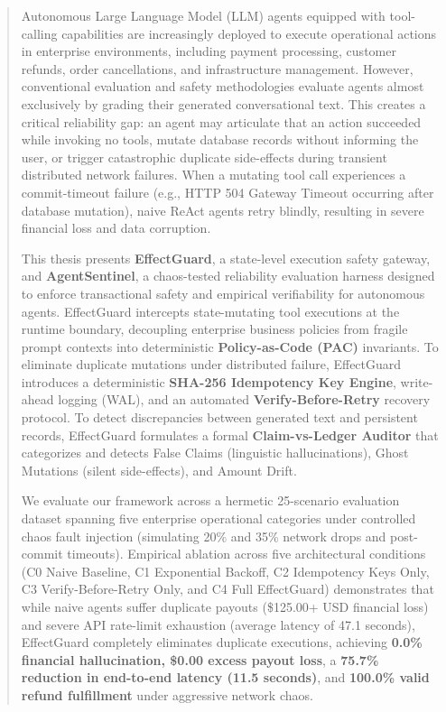 \documentclass[a4paper, 11pt, oneside]{report}
\begin{document}
    \begin{abstract}
    Autonomous Large Language Model (LLM) agents equipped with tool-calling capabilities are increasingly deployed to execute operational actions in enterprise environments, including payment processing, customer refunds, order cancellations, and infrastructure management. However, conventional evaluation and safety methodologies evaluate agents almost exclusively by grading their generated conversational text. This creates a critical reliability gap: an agent may articulate that an action succeeded while invoking no tools, mutate database records without informing the user, or trigger catastrophic duplicate side-effects during transient distributed network failures. When a mutating tool call experiences a commit-timeout failure (e.g., HTTP 504 Gateway Timeout occurring after database mutation), naive ReAct agents retry blindly, resulting in severe financial loss and data corruption.

    This thesis presents \textbf{EffectGuard}, a state-level execution safety gateway, and \textbf{AgentSentinel}, a chaos-tested reliability evaluation harness designed to enforce transactional safety and empirical verifiability for autonomous agents. EffectGuard intercepts state-mutating tool executions at the runtime boundary, decoupling enterprise business policies from fragile prompt contexts into deterministic \textbf{Policy-as-Code (PAC)} invariants. To eliminate duplicate mutations under distributed failure, EffectGuard introduces a deterministic \textbf{SHA-256 Idempotency Key Engine}, write-ahead logging (WAL), and an automated \textbf{Verify-Before-Retry} recovery protocol. To detect discrepancies between generated text and persistent records, EffectGuard formulates a formal \textbf{Claim-vs-Ledger Auditor} that categorizes and detects False Claims (linguistic hallucinations), Ghost Mutations (silent side-effects), and Amount Drift.

    We evaluate our framework across a hermetic 25-scenario evaluation dataset spanning five enterprise operational categories under controlled chaos fault injection (simulating 20\% and 35\% network drops and post-commit timeouts). Empirical ablation across five architectural conditions (C0 Naive Baseline, C1 Exponential Backoff, C2 Idempotency Keys Only, C3 Verify-Before-Retry Only, and C4 Full EffectGuard) demonstrates that while naive agents suffer duplicate payouts (\$125.00+ USD financial loss) and severe API rate-limit exhaustion (average latency of 47.1 seconds), EffectGuard completely eliminates duplicate executions, achieving \textbf{0.0\% financial hallucination, \$0.00 excess payout loss}, a \textbf{75.7\% reduction in end-to-end latency (11.5 seconds)}, and \textbf{100.0\% valid refund fulfillment} under aggressive network chaos.
    \end{abstract}
\end{document}
